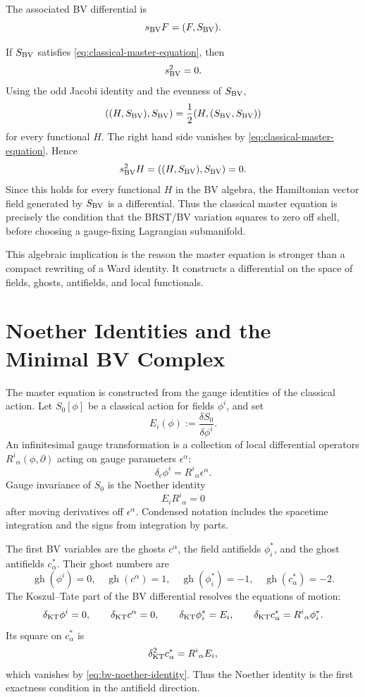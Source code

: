 The associated BV differential is
\[
  s_{\rm BV}F=(F,S_{\rm BV}).
\]

If \(S_{\rm BV}\) satisfies \eqref{eq:classical-master-equation}, then
\[
  s_{\rm BV}^2=0 .
\]
Using the odd Jacobi identity and the evenness of \(S_{\rm BV}\),
\[
  ((H,S_{\rm BV}),S_{\rm BV})
  =
  \frac12(H,(S_{\rm BV},S_{\rm BV}))
\]
for every functional \(H\).  The right hand side vanishes by
\eqref{eq:classical-master-equation}.  Hence
\[
  s_{\rm BV}^2H=((H,S_{\rm BV}),S_{\rm BV})=0 .
\]
Since this holds for every functional \(H\) in the BV algebra, the Hamiltonian
vector field generated by \(S_{\rm BV}\) is a differential.  Thus the
classical master equation is precisely the condition that the BRST/BV
variation squares to zero off shell, before choosing a gauge-fixing
Lagrangian submanifold.

This algebraic implication is the reason the master equation is stronger than
a compact rewriting of a Ward identity.  It constructs a differential on the
space of fields, ghosts, antifields, and local functionals.

\section{Noether Identities and the Minimal BV Complex}

The master equation is constructed from the gauge identities of the classical
action.  Let \(S_0[\phi]\) be a classical action for fields \(\phi^i\), and set
\[
  E_i(\phi):=\frac{\delta S_0}{\delta\phi^i}.
\]
An infinitesimal gauge transformation is a collection of local differential
operators \(R^i{}_\alpha(\phi,\partial)\) acting on gauge parameters
\(\epsilon^\alpha\):
\[
  \delta_\epsilon\phi^i=R^i{}_\alpha\epsilon^\alpha .
\]
Gauge invariance of \(S_0\) is the Noether identity
\begin{equation}
  E_iR^i{}_\alpha=0
  \label{eq:bv-noether-identity}
\end{equation}
after moving derivatives off \(\epsilon^\alpha\).  Condensed notation includes
the spacetime integration and the signs from integration by parts.

The first BV variables are the ghosts \(c^\alpha\), the field antifields
\(\phi^*_i\), and the ghost antifields \(c^*_\alpha\).  Their ghost numbers
are
\[
  \operatorname{gh}(\phi^i)=0,\quad
  \operatorname{gh}(c^\alpha)=1,\quad
  \operatorname{gh}(\phi^*_i)=-1,\quad
  \operatorname{gh}(c^*_\alpha)=-2.
\]
The Koszul--Tate part of the BV differential resolves the equations of
motion:
\[
  \delta_{\rm KT}\phi^i=0,\qquad
  \delta_{\rm KT}c^\alpha=0,\qquad
  \delta_{\rm KT}\phi^*_i=E_i,\qquad
  \delta_{\rm KT}c^*_\alpha=R^i{}_\alpha\phi^*_i .
\]
Its square on \(c^*_\alpha\) is
\[
  \delta_{\rm KT}^2 c^*_\alpha
  =
  R^i{}_\alpha E_i,
\]
which vanishes by \eqref{eq:bv-noether-identity}.  Thus the Noether identity
is the first exactness condition in the antifield direction.

